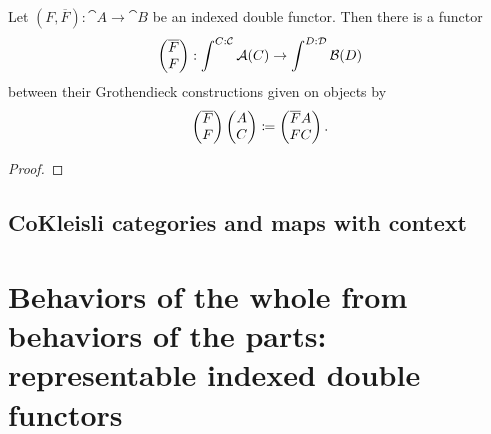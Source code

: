 \documentclass[DynamicalBook]{subfiles}
\begin{document}
\begin{proposition}\label{prop.groth_construction_functoriality}
  Let $(F, \overline{F}) : \cat{A} \to \cat{B}$ be an indexed double functor.
  Then there is a functor
  $$\begin{pmatrix}{\overline{F}} \\ {F} \end{pmatrix} : \int^{C : \mathcal{C}} \mathcal{A}(C) \to \int^{D :
    \mathcal{D}} \mathcal{B}(D)$$
  between their Grothendieck constructions given on objects by
  $$\begin{pmatrix}{\overline{F}} \\ {F} \end{pmatrix} \begin{pmatrix}{A} \\ {C} \end{pmatrix} \coloneqq \begin{pmatrix}{\overline{F}A} \\ {FC} \end{pmatrix}.$$
\end{proposition}
\begin{proof}

\end{proof}



\subsection{CoKleisli categories and maps with context}\label{sec.context_indexed_cat}

  
\section{Behaviors of the whole from behaviors of the parts: representable
  indexed double functors}\label{sec.representables}
\end{document}
